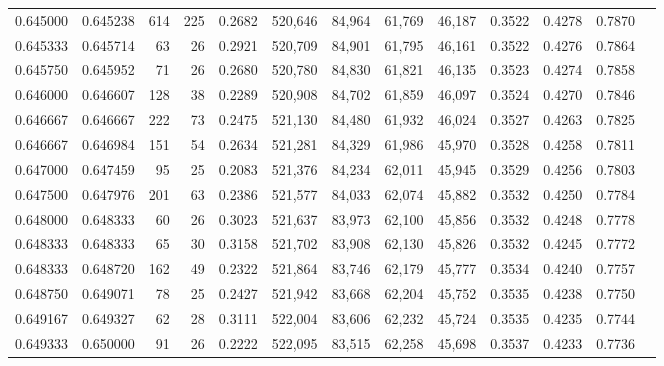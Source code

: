 \begin{tabular}{rrrrrrrrrrrrr}
0.645000 & 0.645238 &   614 & 225 &                                     0.2682 & 520,646 &  84,964 &  61,769 &  46,187 & 0.3522 & 0.4278 & 0.7870 \\
0.645333 & 0.645714 &    63 &  26 &                                     0.2921 & 520,709 &  84,901 &  61,795 &  46,161 & 0.3522 & 0.4276 & 0.7864 \\
0.645750 & 0.645952 &    71 &  26 &                                     0.2680 & 520,780 &  84,830 &  61,821 &  46,135 & 0.3523 & 0.4274 & 0.7858 \\
0.646000 & 0.646607 &   128 &  38 &                                     0.2289 & 520,908 &  84,702 &  61,859 &  46,097 & 0.3524 & 0.4270 & 0.7846 \\
0.646667 & 0.646667 &   222 &  73 &                                     0.2475 & 521,130 &  84,480 &  61,932 &  46,024 & 0.3527 & 0.4263 & 0.7825 \\
0.646667 & 0.646984 &   151 &  54 &                                     0.2634 & 521,281 &  84,329 &  61,986 &  45,970 & 0.3528 & 0.4258 & 0.7811 \\
0.647000 & 0.647459 &    95 &  25 &                                     0.2083 & 521,376 &  84,234 &  62,011 &  45,945 & 0.3529 & 0.4256 & 0.7803 \\
0.647500 & 0.647976 &   201 &  63 &                                     0.2386 & 521,577 &  84,033 &  62,074 &  45,882 & 0.3532 & 0.4250 & 0.7784 \\
0.648000 & 0.648333 &    60 &  26 &                                     0.3023 & 521,637 &  83,973 &  62,100 &  45,856 & 0.3532 & 0.4248 & 0.7778 \\
0.648333 & 0.648333 &    65 &  30 &                                     0.3158 & 521,702 &  83,908 &  62,130 &  45,826 & 0.3532 & 0.4245 & 0.7772 \\
0.648333 & 0.648720 &   162 &  49 &                                     0.2322 & 521,864 &  83,746 &  62,179 &  45,777 & 0.3534 & 0.4240 & 0.7757 \\
0.648750 & 0.649071 &    78 &  25 &                                     0.2427 & 521,942 &  83,668 &  62,204 &  45,752 & 0.3535 & 0.4238 & 0.7750 \\
0.649167 & 0.649327 &    62 &  28 &                                     0.3111 & 522,004 &  83,606 &  62,232 &  45,724 & 0.3535 & 0.4235 & 0.7744 \\
0.649333 & 0.650000 &    91 &  26 &                                     0.2222 & 522,095 &  83,515 &  62,258 &  45,698 & 0.3537 & 0.4233 & 0.7736 \\

\end{tabular}
